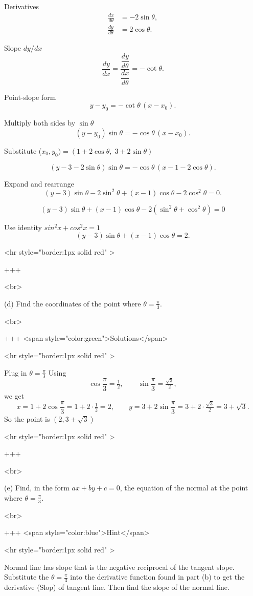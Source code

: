 Derivatives
\begin{align*}
\frac{dx}{d\theta} &= -2\sin\theta,\\
\frac{dy}{d\theta} &= 2\cos\theta.
\end{align*}

Slope $dy/dx$
$$
\frac{dy}{dx} = \frac{\dfrac{dy}{d\theta}}{\dfrac{dx}{d\theta}} = -\cot\theta.
$$


Point-slope form
$$
y - y_0 = -\cot\theta\,(x-x_0).
$$

Multiply both sides by $\sin\theta$
$$
(y-y_0)\sin\theta = -\cos\theta\,(x-x_0).
$$

Substitute ($x_0,y_0)=(1+2\cos\theta,\;3+2\sin\theta)$

$$
(y-3-2\sin\theta)\sin\theta = -\cos\theta\,(x-1-2\cos\theta).
$$


Expand and rearrange
$$
(y-3)\sin\theta - 2\sin^2\theta + (x-1)\cos\theta - 2\cos^2\theta = 0.
$$

$$
(y-3)\sin\theta + (x-1)\cos\theta - 2(\sin^2\theta+\cos^2\theta) = 0
$$

Use identity $sin^2x+cos^2x=1$
$$
(y-3)\sin\theta + (x-1)\cos\theta = 2.
$$

<hr style="border:1px solid red" >

+++

<br>


(d) Find the coordinates of the point where $\theta=\frac{\pi}{3}$.

<br>

+++ <span style="color:green">Solutions</span>

<hr style="border:1px solid red" >

Plug in $\theta=\frac{\pi}{3}$ Using
$$
\cos\frac{\pi}{3}=\tfrac{1}{2},\qquad \sin\frac{\pi}{3}=\tfrac{\sqrt{3}}{2},
$$
we get
$$
x=1+2\cos\frac{\pi}{3}=1+2\cdot\tfrac{1}{2}=2,
\qquad
y=3+2\sin\frac{\pi}{3}=3+2\cdot\tfrac{\sqrt{3}}{2}=3+\sqrt{3}.
$$
So the point is $(2,3+\sqrt{3})$

<hr style="border:1px solid red" >

+++

<br>


(e) Find, in the form $a x+b y+c=0$, the equation of the normal at the point where $\theta=\frac{\pi}{3}$.

<br>

+++ <span style="color:blue">Hint</span>

<hr style="border:1px solid red" >

Normal line has slope that is the negative reciprocal of the tangent slope. Substitute the $\theta = \frac{\pi}{3}$ into the derivative function found in part (b) to get the derivative (Slop) of tangent line. Then find the slope of the normal line.

